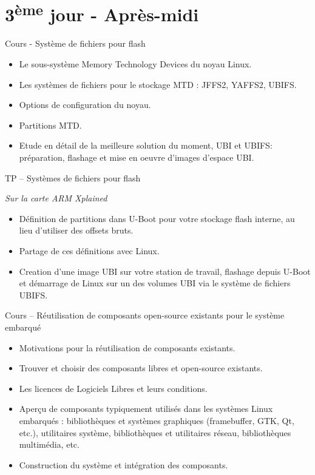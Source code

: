 \documentclass[a4paper,12pt,obeyspaces,spaces,hyphens]{article}
\begin{document}
\section{3\textsuperscript{ème} jour - Après-midi}

\feagendatwocolumn
{Cours - Système de fichiers pour flash}
{
  \begin{itemize}
  \item Le sous-système Memory Technology Devices du noyau Linux.
  \item Les systèmes de fichiers pour le stockage MTD : JFFS2, YAFFS2, UBIFS.
  \item Options de configuration du noyau.
  \item Partitions MTD.
  \item Etude en détail de la meilleure solution du moment, UBI et UBIFS:
	préparation, flashage et mise en oeuvre d'images d'espace UBI.

  \end{itemize}
}
{TP – Systèmes de fichiers pour flash}
{
  {\em Sur la carte ARM Xplained}
  \begin{itemize}
  \item Définition de partitions dans U-Boot pour
        votre stockage flash interne, au lieu d'utiliser
        des offsets bruts.
  \item Partage de ces définitions avec Linux.
  \item Creation d'une image UBI sur votre station de travail,
	flashage depuis U-Boot et démarrage de Linux sur un 
        des volumes UBI via le système de fichiers UBIFS.
  \end{itemize}
}

\feagendaonecolumn
{Cours – Réutilisation de composants open-source existants pour le système
embarqué}
{
  \begin{itemize}
  \item Motivations pour la réutilisation de composants existants.
  \item Trouver et choisir des composants libres et open-source existants.
  \item Les licences de Logiciels Libres et leurs conditions.
  \item Aperçu de composants typiquement utilisés dans les systèmes
	Linux embarqués : bibliothèques et systèmes graphiques (framebuffer,
	GTK, Qt, etc.), utilitaires système, bibliothèques et
	utilitaires réseau, bibliothèques multimédia, etc.
  \item Construction du système et intégration des composants.
  \end{itemize}
}
\end{document}
